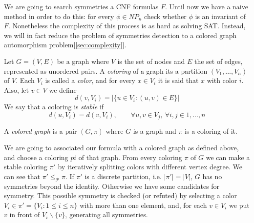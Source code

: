 We are going to search symmetries a CNF formulas $F$. Until now we have a naive method in order to do this: for every $\phi \in NP_n$ check whether $\phi$ is an invariant of $F$. Nonetheless the complexity of this process is as hard as solving SAT. Instead, we will in fact reduce the problem of symmetries detection to a colored graph  automorphism problem[\ref{sec:complexity}].\\








\begin{definition}
  Let $G = (V,E)$ be a graph where $V$ is the set of nodes and $E$ the set of edges, represented as unordered pairs. A \emph{coloring} of a graph its a partition  $(V_1,...,V_n)$ of $V$. Each  $V_i$ is called a \emph{color}, and for every $x\in V_i$ it is said that $x$ with color $i$. Also, let $v\in V$ we define $$d(v, V_i) = |\{u \in V_i : (u,v)\in E\}|$$
  We say that a coloring is \emph{stable} if
  $$d(u,V_i) = d(v,V_i), \qquad  \forall u,v \in V_j,\ \forall i,j \in 1,...,n$$

  A \emph{colored graph} is a pair $(G,\pi)$ where $G$ is a graph and $\pi$ is a coloring of it.
\end{definition}


We are going to associated our formula with a colored graph as defined above, and choose a coloring $pi$ of that graph. From every coloring $\pi$ of $G$ we can make a stable coloring $\pi'$ by iteratively splitting colors with different vertex degree. We can see that $\pi' \le_\mathcal{P} \pi$. If $\pi'$ is a discrete partition, i.e. $|\pi'| = |V|$,  $G$ has no symmetries beyond the identity. Otherwise we have some candidates for symmetry. This possible symmetry is checked (or refuted) by selecting a color $V_i\in \pi' = \{V_i : 1 \le i \le n\}$ with more than one element, and, for each $v\in V_i$ we put $v$ in front of $V_i \backslash \{v\}$, generating all symmetries.


